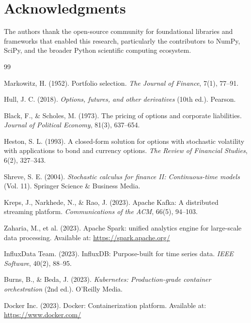 \documentclass[12pt,a4paper]{article}
\theoremstyle{definition}
\theoremstyle{remark}
\begin{document}
\section*{Acknowledgments}

The authors thank the open-source community for foundational libraries and frameworks that enabled this research, particularly the contributors to NumPy, SciPy, and the broader Python scientific computing ecosystem.

\begin{thebibliography}{99}

Markowitz, H. (1952). Portfolio selection. \textit{The Journal of Finance}, 7(1), 77--91.

Hull, J. C. (2018). \textit{Options, futures, and other derivatives} (10th ed.). Pearson.

Black, F., \& Scholes, M. (1973). The pricing of options and corporate liabilities. \textit{Journal of Political Economy}, 81(3), 637--654.

Heston, S. L. (1993). A closed-form solution for options with stochastic volatility with applications to bond and currency options. \textit{The Review of Financial Studies}, 6(2), 327--343.

Shreve, S. E. (2004). \textit{Stochastic calculus for finance II: Continuous-time models} (Vol. 11). Springer Science \& Business Media.

Kreps, J., Narkhede, N., \& Rao, J. (2023). Apache Kafka: A distributed streaming platform. \textit{Communications of the ACM}, 66(5), 94--103.

Zaharia, M., et al. (2023). Apache Spark: unified analytics engine for large-scale data processing. Available at: \url{https://spark.apache.org/}

InfluxData Team. (2023). InfluxDB: Purpose-built for time series data. \textit{IEEE Software}, 40(2), 88--95.

Burns, B., \& Beda, J. (2023). \textit{Kubernetes: Production-grade container orchestration} (2nd ed.). O'Reilly Media.

Docker Inc. (2023). Docker: Containerization platform. Available at: \url{https://www.docker.com/}


\end{thebibliography}
\end{document}

